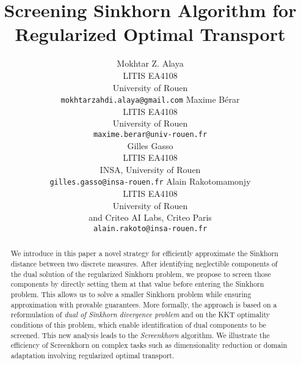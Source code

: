 \documentclass{article}
\title{Screening Sinkhorn Algorithm for Regularized Optimal Transport}
\begin{document}
\author{%
Mokhtar Z. Alaya \\
LITIS EA4108\\
University of Rouen\\
\texttt{mokhtarzahdi.alaya@gmail.com} 
\And
Maxime Bérar\\
LITIS EA4108\\
University of Rouen\\
\texttt{maxime.berar@univ-rouen.fr} \\
\And
Gilles Gasso \\
LITIS EA4108\\
INSA, University of Rouen\\
\texttt{gilles.gasso@insa-rouen.fr} 
\And
Alain Rakotomamonjy\\
LITIS EA4108 \\
University of Rouen\\
and Criteo AI Labs, Criteo Paris \\
\texttt{alain.rakoto@insa-rouen.fr} \\
}

\maketitle

\begin{abstract}
We introduce in this paper a novel strategy for efficiently approximate the Sinkhorn distance between two discrete measures. After identifying neglectible components
of the dual solution of the regularized Sinkhorn problem, we propose to screen those components by directly setting them at that value before entering the Sinkhorn problem. This allows us to solve a smaller Sinkhorn problem while ensuring approximation with provable guarantees.
More formally, the approach is based on a reformulation of \emph{dual of Sinkhorn divergence problem} and on the KKT optimality conditions of this problem, which enable identification of dual components to be screened.
This new analysis leads to the \emph{Screenkhorn} algorithm.
We illustrate the efficiency of Screenkhorn on complex tasks such as dimensionality reduction or domain adaptation involving regularized optimal transport.
\end{abstract}









\small



%
\end{document}
